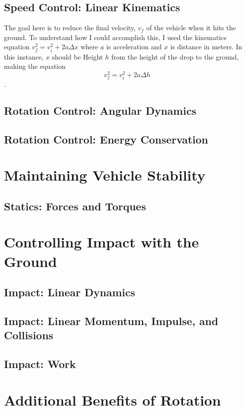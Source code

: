 \documentclass[12pt]{report}
\begin{document}
\section{Speed Control: Linear Kinematics}
The goal here is to reduce the final velocity, $v_f$ of the vehicle when it hits the ground. To understand how I could accomplish this, I used the kinematics equation $v_f^2 = v_i^2 + 2a\Delta x$ where $a$ is acceleration and $x$ is distance in meters. In this instance, $x$ should be Height $h$ from the height of the drop to the ground, making the equation 
\begin{equation} \label{eq:2}
v_f^2 = v_i^2 + 2a\Delta h
\end{equation}.



\section{Rotation Control: Angular Dynamics}
\section{Rotation Control: Energy Conservation}


\chapter{Maintaining Vehicle Stability}
\section{Statics: Forces and Torques}


\chapter{Controlling Impact with the Ground}
\section{Impact: Linear Dynamics}
\section{Impact: Linear Momentum, Impulse, and Collisions}
\section{Impact: Work}


\chapter{Additional Benefits of Rotation}
\end{document}

